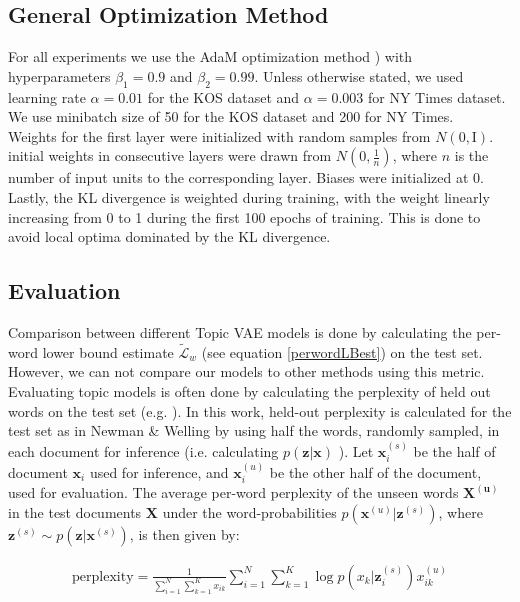 \documentclass{report}
\begin{document}
	\subsection{General Optimization Method}\label{optim_section}
	For all experiments we use the AdaM optimization method \cite{kingma2014adam}) with hyperparameters $\beta_1 = 0.9$ and $\beta_2 = 0.99$. Unless otherwise stated, we used learning rate $\alpha = 0.01$ for the KOS dataset and $\alpha = 0.003$ for NY Times dataset.  We use minibatch size of 50 for the KOS dataset and 200 for NY Times.  \\
	Weights for the first layer were initialized with random samples from $N(0,\text{I})$. initial weights in consecutive layers were drawn from  $N(0,\frac{1}{n})$, where $n$ is the number of input units to the corresponding layer. Biases were initialized at 0.
	\\Lastly, the KL divergence is weighted during training, with the weight linearly increasing from 0 to 1 during the first 100 epochs of training. This is done to avoid local optima dominated by the KL divergence. 	
	
	\subsection{Evaluation}\label{eval_section}
	Comparison between different Topic VAE models is done by calculating the per-word lower bound estimate $\tilde{\mathcal{L}}_w$ (see equation \ref{perwordLBest}) on the test set. However, we can not compare our models to other methods using this metric. \\
	Evaluating topic models is often done by calculating the perplexity of held out words on the test set (e.g. \cite{blei2003latent, newman2007distributed, ranganath2015deep}). In this work, held-out perplexity is calculated for the test set as in Newman \& Welling \cite{newman2007distributed} by using half the words, randomly sampled, in each document for inference (i.e. calculating $p(\mathbf{z}|\mathbf{x})$ ). Let $\mathbf{x}_{i}^{(s)}$ be the half of document $\mathbf{x}_i$ used for inference, and $\mathbf{x}_{i}^{(u)}$ be the other half of the document, used for evaluation. The average per-word perplexity of the unseen words $\mathbf{X^{(u)}}$ in the test documents $\mathbf{X}$ under the word-probabilities $p(\mathbf{x}^{(u)}|\mathbf{z}^{(s)})$, where $\mathbf{z}^{(s)} \sim p(\mathbf{z}|\mathbf{x}^{(s)})$, is then given by:
	
	
	\begin{align}
	\text{perplexity} =  \frac{1}{\sum\limits_{i=1}^{N}\sum\limits_{k=1}^{K}x_{ik}}\sum\limits_{i=1}^N\sum\limits_{k=1}^{K} \log p(x_{k}|\mathbf{z}_{i}^{(s)})x_{ik}^{(u)}
	\end{align}\\
	
\end{document}

